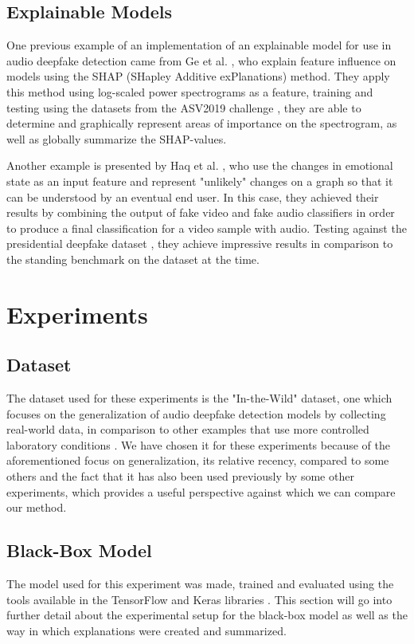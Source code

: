 \documentclass{article}
\begin{document}
	\subsection{Explainable Models}
	One previous example of an implementation of an explainable model for use in audio deepfake
	detection came from Ge et al. \cite{ge_explaining_2024}, who explain feature influence on
	models using the SHAP (SHapley Additive exPlanations) method. They apply this method using
	log-scaled power spectrograms as a feature, training and testing using the datasets from the
	ASV2019 challenge \cite{wang_asvspoof_2020}, they are able to determine and graphically
	represent areas of importance on the spectrogram, as well as globally summarize the
	SHAP-values.
	\par
	Another example is presented by Haq et al. \cite{haq_multimodal_2023}, who use
	the changes in emotional state as an input feature and represent "unlikely" changes on a graph
	so that it can be understood by an eventual end user. In this case, they achieved their
	results by combining the output of fake video and fake audio classifiers in order to produce a
	final classification for a video sample with audio. Testing against the presidential deepfake
	dataset \cite{sankaranarayanan_presidential_nodate}, they achieve impressive results in
	comparison to the standing benchmark on the dataset at the time.
	\section{Experiments}
		\subsection{Dataset}
		The dataset used for these experiments is the "In-the-Wild" dataset, one which focuses on
		the generalization of audio deepfake detection models by collecting real-world data, in
		comparison to other examples that use more controlled laboratory conditions
		\cite{muller_does_2022}. We have chosen it for these experiments because of the
		aforementioned focus on generalization, its relative recency, compared to some others and
		the fact that it has also been used previously by some other experiments, which provides a
		useful perspective against which we can compare our method.
		\subsection{Black-Box Model}
		The model used for this experiment was made, trained and evaluated using the tools
		available in the TensorFlow and Keras libraries \cite{tensorflow2015-whitepaper}. This
		section will go into further detail about the experimental setup for the black-box model
		as well as the way in which explanations were created and summarized.
\end{document}
